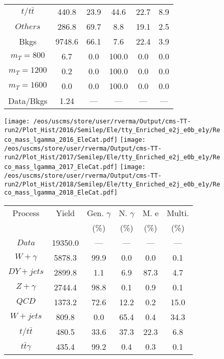\begin{figure}
\begin{minipage}[c]{0.32\textwidth}
{\begin{tabular}{cccccc}
$ t/t\bar{t} $ &  440.8 &  23.9 &  44.6 &  22.7 &  8.9\\
$ Others $ &  286.8 &  69.7 &  8.8 &  19.1 &  2.5\\
Bkgs &  9748.6 &  66.1 &  7.6 &  22.4 &  3.9\\
$ m_{T} = 800 $ &  6.7 &  0.0 &  100.0 &  0.0 &  0.0\\
$ m_{T} = 1200 $ &  0.2 &  0.0 &  100.0 &  0.0 &  0.0\\
$ m_{T} = 1600 $ &  0.0 &  0.0 &  100.0 &  0.0 &  0.0\\
Data/Bkgs &  1.24 &  --- &  --- &  --- &  ---\\
\hline
\end{tabular}
}
\end{minipage}
\end{figure}

\begin{figure}
\centering
\texttt{[image: /eos/uscms/store/user/rverma/Output/cms-TT-run2/Plot\_Hist/2016/Semilep/Ele/tty\_Enriched\_e2j\_e0b\_e1y/Reco\_mass\_lgamma\_2016\_EleCat.pdf]}
\texttt{[image: /eos/uscms/store/user/rverma/Output/cms-TT-run2/Plot\_Hist/2017/Semilep/Ele/tty\_Enriched\_e2j\_e0b\_e1y/Reco\_mass\_lgamma\_2017\_EleCat.pdf]}
\texttt{[image: /eos/uscms/store/user/rverma/Output/cms-TT-run2/Plot\_Hist/2018/Semilep/Ele/tty\_Enriched\_e2j\_e0b\_e1y/Reco\_mass\_lgamma\_2018\_EleCat.pdf]}
\begin{minipage}[c]{0.32\textwidth}
\centering
\tiny{
\begin{tabular}{cccccc}
\hline
Process & Yield & Gen. $\gamma$ & N. $\gamma$ & M. e & Multi. \\
 &  & (\%) & (\%) & (\%) & (\%)  \\
\hline
                                                                      $ Data $ &  19350.0 &  --- &  --- &  --- &  ---\\
$ W+\gamma $ &  5878.3 &  99.9 &  0.0 &  0.0 &  0.1\\
$ DY+jets $ &  2899.8 &  1.1 &  6.9 &  87.3 &  4.7\\
$ Z+\gamma $ &  2744.4 &  98.8 &  0.1 &  0.9 &  0.1\\
$ QCD $ &  1373.2 &  72.6 &  12.2 &  0.2 &  15.0\\
$ W+jets $ &  809.8 &  0.0 &  65.4 &  0.4 &  34.3\\
$ t/t\bar{t} $ &  480.5 &  33.6 &  37.3 &  22.3 &  6.8\\
$ t\bar{t}\gamma $ &  435.4 &  99.2 &  0.4 &  0.3 &  0.1\\

\end{tabular}}
\end{minipage}
\end{figure}
